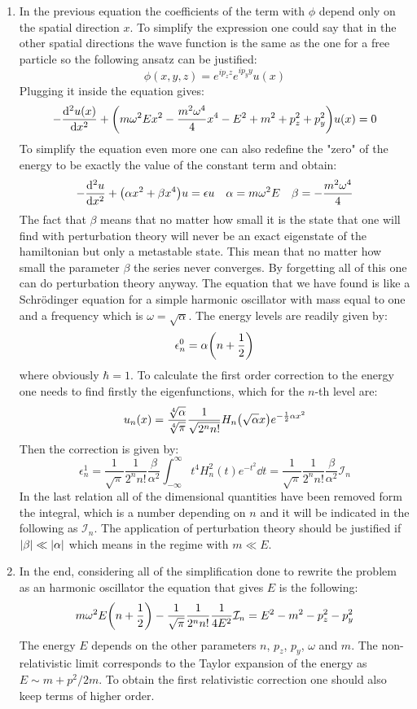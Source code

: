 \documentclass[11pt, oneside]{article}   	%
\begin{document}
\begin{enumerate}[label=\alph*)]
\item In the previous equation the coefficients of the term with $\phi$ depend only on the spatial direction $x$. To simplify the expression one could say that in the other spatial directions the wave function is the same as the one for a free particle so the following ansatz can be justified:
\[
	\phi (x, y, z) = e^{i p_z z} e^{i p_y y} u(x)
\]
Plugging it inside the equation gives:
\[
	-\dv[2]{u(x)}{x} + \qty( m\omega^2 E x^2 - \frac{m^2\omega^4}{4} x^4 - E^2 + m^2 + p_z^2 + p_y^2) u(x) = 0
\]
To simplify the equation even more one can also redefine the "zero" of the energy to be exactly the value of the constant term and obtain:
\[
	-\dv[2]{u}{x} + \qty(\alpha x^2 + \beta x^4)u = \epsilon u  \quad \alpha = m\omega^2 E \quad \beta = - \frac{m^2\omega^4}{4}
\]
The fact that $\beta$ means that no matter how small it is the state that one will find with perturbation theory will never be an exact eigenstate of the hamiltonian but only a metastable state. This mean that no matter how small the parameter $\beta$ the series never converges. By forgetting all of this one can do perturbation theory anyway. The equation that we have found is like a Schr\"odinger equation for a simple harmonic oscillator with mass equal to one and a frequency which is $\omega = \sqrt{\alpha}$. The energy levels are readily given by:
\[
	\epsilon_n^0 = \alpha \qty(n + \frac{1}{2})
\]
where obviously $\hbar = 1$. To calculate the first order correction to the energy one needs to find firstly the eigenfunctions, which for the $n$-th level are:
\[
	u_n(x) = \frac{\sqrt[4]{\alpha}}{\sqrt[4]{\pi}}\frac{1}{\sqrt{2^n n !}} H_n\qty(\sqrt{\alpha} x) e^{-\frac{1}{2}\alpha x^2}
\]
Then the correction is given by:
\[
	\epsilon^1_n = \frac{1}{\sqrt{\pi}} \frac{1}{2^n n!} \frac{\beta}{\alpha^2} \int_{-\infty}^\infty t^4 H_n^2(t) e^{-t^2} \dd{t} = \frac{1}{\sqrt{\pi}} \frac{1}{2^n n!} \frac{\beta}{\alpha^2} \mathcal{I}_n
\]
In the last relation all of the dimensional quantities have been removed form the integral, which is a number depending on $n$ and it will be indicated in the following as $\mathcal{I}_n$.
The application of perturbation theory should be justified if $\abs{\beta} \ll \abs{\alpha}$ which means in the regime with $m \ll E$.

\item In the end, considering all of the simplification done to rewrite the problem as an harmonic oscillator the equation that gives $E$ is the following:
\[
	m\omega^2 E\qty(n+\frac{1}{2}) - \frac{1}{\sqrt{\pi}} \frac{1}{2^n n!} \frac{1}{4E^2} \mathcal{I}_n = E^2 - m^2 - p_z^2 - p_y^2
\]
The energy $E$ depends on the other parameters $n$, $p_z$, $p_y$, $\omega$ and $m$. The non-relativistic limit corresponds to the Taylor expansion of the energy as $E \sim m  + p^2 / 2m$. To obtain the first relativistic correction one should also keep terms of higher order.
\end{enumerate}
\end{document}
